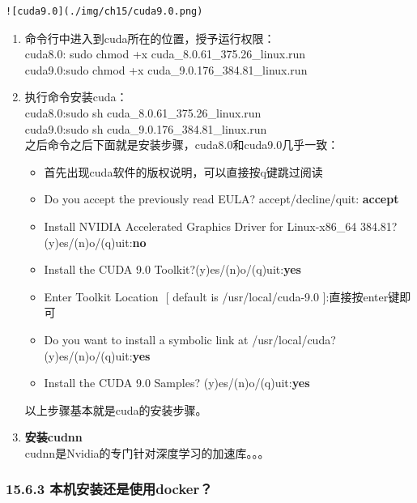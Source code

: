 \begin{verbatim}
![cuda9.0](./img/ch15/cuda9.0.png)  
\end{verbatim}

\begin{enumerate}
\def\labelenumi{\arabic{enumi}.}
\setcounter{enumi}{1}
\item
  命令行中进入到cuda所在的位置，授予运行权限：\\
  cuda8.0: sudo chmod +x cuda\_8.0.61\_375.26\_linux.run\\
  cuda9.0:sudo chmod +x cuda\_9.0.176\_384.81\_linux.run
\item
  执行命令安装cuda：\\
  cuda8.0:sudo sh cuda\_8.0.61\_375.26\_linux.run\\
  cuda9.0:sudo sh cuda\_9.0.176\_384.81\_linux.run\\
  之后命令之后下面就是安装步骤，cuda8.0和cuda9.0几乎一致：

  \begin{itemize}
  \item
    首先出现cuda软件的版权说明，可以直接按q键跳过阅读
  \item
    Do you accept the previously read EULA? ​accept/decline/quit:
    \textbf{accept}
  \item
    Install NVIDIA Accelerated Graphics Driver for Linux-x86\_64 384.81?
    ​(y)es/(n)o/(q)uit:\textbf{no}
  \item
    Install the CUDA 9.0 Toolkit? ​(y)es/(n)o/(q)uit:\textbf{yes}
  \item
    Enter Toolkit Location ​ {[} default is /usr/local/cuda-9.0
    {]}:直接按enter键即可
  \item
    Do you want to install a symbolic link at /usr/local/cuda?
    ​(y)es/(n)o/(q)uit:\textbf{yes}
  \item
    Install the CUDA 9.0 Samples? ​ (y)es/(n)o/(q)uit:\textbf{yes}
  \end{itemize}

  以上步骤基本就是cuda的安装步骤。
\item
  \textbf{安装cudnn}\\
  cudnn是Nvidia的专门针对深度学习的加速库。。。
\end{enumerate}

\subsubsection{15.6.3
本机安装还是使用docker？}\label{ux672cux673aux5b89ux88c5ux8fd8ux662fux4f7fux7528docker}

